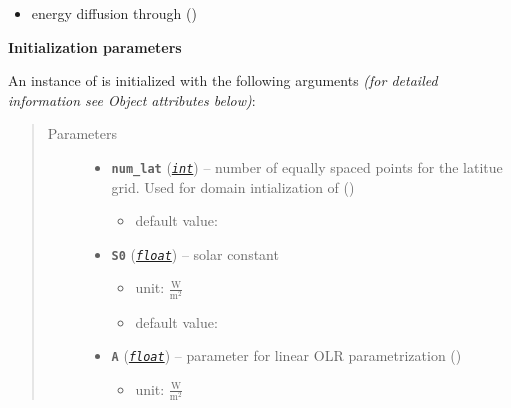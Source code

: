 \documentclass[a4paper,10pt,english]{sphinxmanual}
\begin{document}
\begin{fulllineitems}
\begin{itemize}
\item {} 
energy diffusion through 
{\hyperref[api/climlab.dynamics:climlab.dynamics.diffusion.MeridionalDiffusion]{\emph{}}} ()

\end{itemize}

\textbf{Initialization parameters}

An instance of  is initialized with the following 
arguments \emph{(for detailed information see Object attributes below)}:
\begin{quote}\begin{description}
\item[{Parameters}] \leavevmode\begin{itemize}
\item {} 
\textbf{\texttt{num\_lat}} (\href{http://docs.python.org/2.7/library/functions.html\#int}{\emph{\texttt{int}}}) -- 
number of equally spaced points for the 
latitue grid. Used for domain intialization of
{\hyperref[api/climlab.domain:climlab.domain.domain.zonal_mean_surface]{\emph{}}} ()
\begin{itemize}
\item {} 
default value: 

\end{itemize}


\item {} 
\textbf{\texttt{S0}} (\href{http://docs.python.org/2.7/library/functions.html\#float}{\emph{\texttt{float}}}) -- 
solar constant
\begin{itemize}
\item {} 
unit: \(\frac{\textrm{W}}{\textrm{m}^2}\)

\item {} 
default value: 

\end{itemize}


\item {} 
\textbf{\texttt{A}} (\href{http://docs.python.org/2.7/library/functions.html\#float}{\emph{\texttt{float}}}) -- 
parameter for linear OLR parametrization
{\hyperref[api/climlab.radiation:climlab.radiation.AplusBT.AplusBT]{\emph{}}} ()
\begin{itemize}
\item {} 
unit: \(\frac{\textrm{W}}{\textrm{m}^2}\)


\end{itemize}
\end{itemize}
\end{description}
\end{quote}
\end{fulllineitems}
\end{document}
